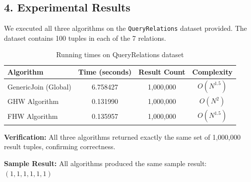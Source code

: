 \documentclass[11pt]{article}
\begin{document}
\subsection*{4. Experimental Results}

We executed all three algorithms on the \texttt{QueryRelations} dataset provided. The dataset contains 100 tuples in each of the 7 relations.

\begin{table}[h!]
\centering
\begin{tabular}{|l|c|c|c|}
\hline
\textbf{Algorithm} & \textbf{Time (seconds)} & \textbf{Result Count} & \textbf{Complexity} \\ \hline
GenericJoin (Global) & 6.758427 & 1,000,000 & $O(N^{1.5})$ \\ \hline
GHW Algorithm & 0.131990 & 1,000,000 & $O(N^2)$ \\ \hline
FHW Algorithm & 0.135957 & 1,000,000 & $O(N^{1.5})$ \\ \hline
\end{tabular}
\caption{Running times on QueryRelations dataset}
\end{table}

\textbf{Verification:} All three algorithms returned exactly the same set of 1,000,000 result tuples, confirming correctness.

\textbf{Sample Result:} All algorithms produced the same sample result: $(1, 1, 1, 1, 1, 1)$
\end{document}
